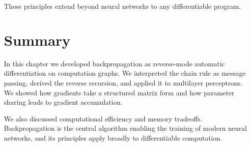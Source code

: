 These principles extend beyond neural networks to any differentiable program.

\section{Summary}

In this chapter we developed backpropagation as reverse-mode automatic differentiation on computation graphs. We interpreted the chain rule as message passing, derived the reverse recursion, and applied it to multilayer perceptrons. We showed how gradients take a structured matrix form and how parameter sharing leads to gradient accumulation.

We also discussed computational efficiency and memory tradeoffs. Backpropagation is the central algorithm enabling the training of modern neural networks, and its principles apply broadly to differentiable computation.